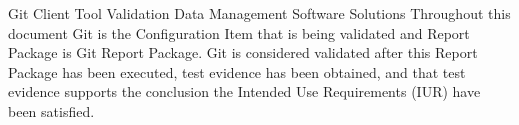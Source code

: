 \documentclass[10pt]{tlc-article}
\begin{document}
  \global\def\configurationitem{Git}

  \tlcTitlePageAndTableOfContents
    {Git Client Tool Validation}
    {Data Management Software Solutions}
    {Throughout this document Git is the Configuration Item that is being
     validated and Report Package is Git Report Package.  Git is
     considered validated after this Report Package has been executed, test
     evidence has been obtained, and that test evidence supports the conclusion
     the Intended Use Requirements (IUR) have been satisfied.}

  
\end{document}
